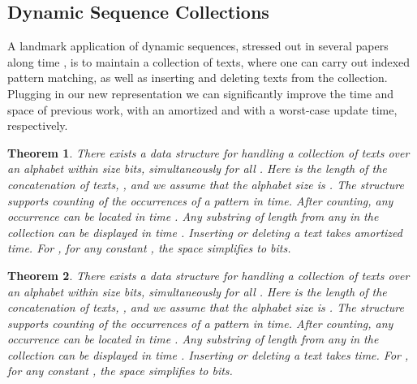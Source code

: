 \documentclass[11pt]{article}
\newcommand{\no}[1]{}
\newtheorem{theorem}{Theorem}
\begin{document}
\no{
\subsection{Block Updates}

\section{Applications} \label{sec:app}

Our new results impact in a number of applications that build on dynamic
sequences. We describe several here.
}

\subsection{Dynamic Sequence Collections} 

A landmark application of dynamic
sequences, stressed out in several papers along time
\cite{CHL04,MN06,CHLS07,MN06,LP07,MN08,GN08,LP09,GN09,HM10,NS10}, 
is to maintain a collection  of
texts, where one can carry out indexed pattern matching, as well as inserting
and deleting texts from the collection. Plugging in our new representation we 
can significantly improve the time and space of previous work, with an amortized and with
a worst-case update time, respectively.

\begin{theorem} \label{thm:fmindex}
There exists a data structure for handling a collection  of
texts over an alphabet  within size
 bits, 
simultaneously for all . 
Here  is the length of the concatenation
of  texts, 
  , and we assume that
the alphabet size is .
The structure supports counting of the occurrences
of a pattern  in  time.
After counting, any occurrence can be located in time . 
Any substring of length  from any  in the collection can be displayed 
in time .
Inserting or 
deleting a text  takes  amortized time.
For , for any constant , the 
space simplifies to  bits.
\end{theorem}

\begin{theorem} \label{thm:fmindexwc}
There exists a data structure for handling a collection  of
texts over an alphabet  within size
 bits, 
simultaneously for all . 
Here  is the length of the concatenation
of  texts, 
  , and we assume that
the alphabet size is .
The structure supports counting of the occurrences
of a pattern  in  time.
After counting, any occurrence can be located in time . 
Any substring of length  from any  in the collection can be displayed 
in time .
Inserting or 
deleting a text  takes  time.
For , for any constant , the 
space simplifies to  bits.
\end{theorem}
\end{document}
